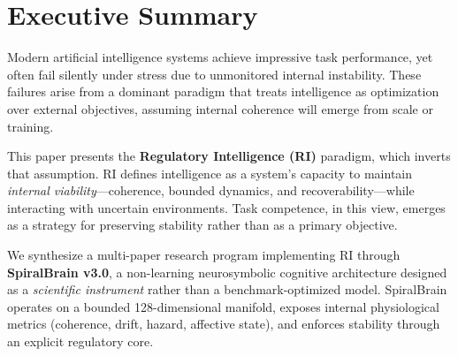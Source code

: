 \documentclass[12pt,a4paper]{report}
\begin{document}
\begin{abstract}
\begin{figure}[H]

  \caption{Graphical abstract of the Regulatory Intelligence paradigm implemented via SpiralBrain v3.0, showing stability-first cognition through geometric manifolds, Lyapunov-bounded dynamics, and reproducible phase-lock regions.}
  \label{fig:graphical-abstract}
\end{figure}
\end{abstract}

\section*{Executive Summary}

Modern artificial intelligence systems achieve impressive task performance, yet often fail silently under stress due to unmonitored internal instability. These failures arise from a dominant paradigm that treats intelligence as optimization over external objectives, assuming internal coherence will emerge from scale or training.

This paper presents the \textbf{Regulatory Intelligence (RI)} paradigm, which inverts that assumption. RI defines intelligence as a system's capacity to maintain \textit{internal viability}—coherence, bounded dynamics, and recoverability—while interacting with uncertain environments. Task competence, in this view, emerges as a strategy for preserving stability rather than as a primary objective.

We synthesize a multi-paper research program implementing RI through \textbf{SpiralBrain v3.0}, a non-learning neurosymbolic cognitive architecture designed as a \textit{scientific instrument} rather than a benchmark-optimized model. SpiralBrain operates on a bounded 128-dimensional manifold, exposes internal physiological metrics (coherence, drift, hazard, affective state), and enforces stability through an explicit regulatory core.
\end{document}
